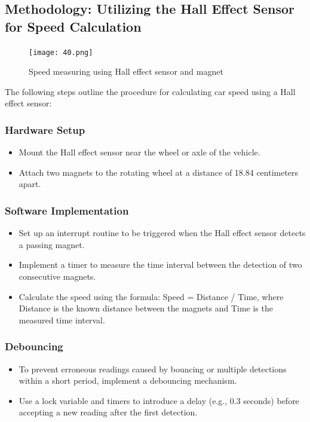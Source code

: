 \documentclass[
12pt,
oneside, 
onehalfspacing, 
nolistspacing, 
parskip, 
chapterinoneline, 
]{AASTCOMPUTER}
\begin{document}
\subsection{Methodology: Utilizing the Hall Effect Sensor for Speed Calculation}
\begin{figure}[!ht]
\centering
\texttt{[image: 40.png]}
\caption[Speed measuring using Hall effect sensor and magnet]{Speed measuring using Hall effect sensor and magnet}
\label{fig:TCU}
\end{figure}

The following steps outline the procedure for calculating car speed using a Hall effect sensor:

\subsubsection{Hardware Setup}
\begin{itemize}
    \item Mount the Hall effect sensor near the wheel or axle of the vehicle.
    \item Attach two magnets to the rotating wheel at a distance of 18.84 centimeters apart.
\end{itemize}

\subsubsection{Software Implementation}
\begin{itemize}
    \item Set up an interrupt routine to be triggered when the Hall effect sensor detects a passing magnet.
    \item Implement a timer to measure the time interval between the detection of two consecutive magnets.
    \item Calculate the speed using the formula: Speed = Distance / Time, where Distance is the known distance between the magnets and Time is the measured time interval.
\end{itemize}

\subsubsection{Debouncing}
\begin{itemize}
    \item To prevent erroneous readings caused by bouncing or multiple detections within a short period, implement a debouncing mechanism.
    \item Use a lock variable and timers to introduce a delay (e.g., 0.3 seconds) before accepting a new reading after the first detection.
\end{itemize}
\end{document}
